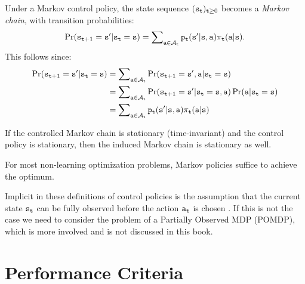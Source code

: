 Under a Markov control policy, the state sequence
${({{\tt s}_{\tt t}})_{{\tt t} \ge 0}}$ becomes a \emph{Markov chain},
with transition probabilities:
\[\Pr({{\tt s}_{{\tt t} + 1}} = {\tt s}'|{{\tt s}_{\tt t}} = {\tt s}) = \sum\nolimits_{{\tt a} \in {\mathcal{A}_{\tt t}}} {{{\tt p}_{\tt t}}} ({\tt s}'|{\tt s},{\tt a}){\pi _{\tt t}}({\tt a}|{\tt s}).\]
This follows since:
\begin{align*}
\Pr({{\tt s}_{{\tt t} + 1}} = {\tt s}'|{{\tt s}_{\tt t}} = {\tt s}) & =
\sum\nolimits_{{\tt a} \in {\mathcal{A}_{\tt t}}} \Pr({{\tt s}_{{\tt t} +
1}} = {\tt s}', {\tt a}|{{\tt s}_{\tt t}} = {\tt s})  \\
& =\sum\nolimits_{{\tt a} \in {\mathcal{A}_{\tt t}}} \Pr({{\tt s}_{{\tt t}
+ 1}} = {\tt s}'|{{\tt s}_{\tt t}} = {\tt s},{\tt a}) \Pr({\tt a} |
{\tt s}_{\tt t}={\tt s}) \\
&= \sum\nolimits_{{\tt a} \in {\mathcal{A}_{\tt t}}} {{{\tt p}_{\tt t}}}
({\tt s}'|{\tt s},{\tt a}){\pi _{\tt t}}({\tt a}|{\tt s})
\end{align*}


If the controlled Markov chain is stationary (time-invariant) and the control policy is stationary, then the induced Markov chain is stationary as well.



\begin{remark}
For most non-learning optimization problems, Markov policies suffice to achieve the optimum.
\end{remark}
\begin{remark}
Implicit in these definitions of control policies is the assumption
that the current state ${{\tt s}_{\tt t}}$ can be fully observed
before the action ${{\tt a}_{\tt t}}$ is chosen . If this is not the
case we need to consider the problem of a Partially Observed MDP
(POMDP), which is more involved and is not discussed in this book.
\end{remark}

\section{Performance Criteria}

